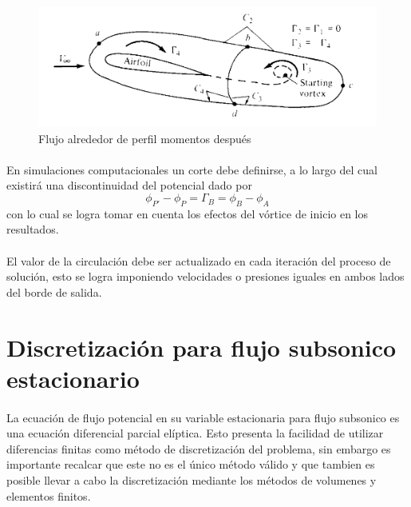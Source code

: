 \documentclass[letterpaper, openright, 12pt]{book}
\begin{document}
        \begin{figure}[htbp!]
            \centering
            \includegraphics[width=115mm]{./Imagenes/circulacion_tiempo}
            \caption[Flujo alrededor de perfil momentos después]{Flujo alrededor
                de perfil momentos después\cite{anderson_fundamentals}}
            \label{circulacion_tiempo}
        \end{figure}

    \paragraph*{}
        En simulaciones computacionales un corte debe definirse, a lo largo del cual existirá
        una discontinuidad del potencial dado por
        \begin{equation}
            \phi_{P'} - \phi_{P} = \Gamma_{B} = \phi_{B} - \phi_{A}
        \end{equation}
        con lo cual se logra tomar en cuenta los efectos del vórtice de inicio
        en los resultados.

    \paragraph*{}
        El valor de la circulación debe ser actualizado en cada iteración del
        proceso de solución, esto se logra imponiendo velocidades o presiones
        iguales en ambos lados del borde de salida.

    \section{Discretización para flujo subsonico estacionario}
    \paragraph*{}
        La ecuación de flujo potencial en su variable estacionaria para flujo
        subsonico es una ecuación diferencial parcial elíptica. Esto presenta la
        facilidad de utilizar diferencias finitas como método de discretización
        del problema, sin embargo es importante recalcar que este no es el
        único método válido y que tambien es posible llevar a cabo la
        discretización mediante los métodos de volumenes y elementos finitos.
\end{document}
